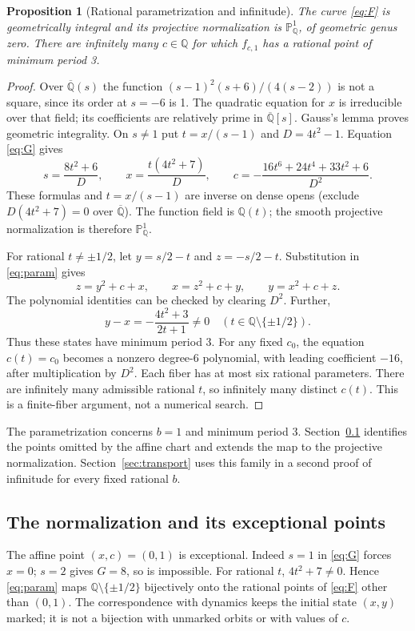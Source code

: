 \documentclass{jT}
\newcommand{\Q}{\mathbb Q}
\newcommand{\PP}{\mathbb P}
\newtheorem{proposition}{Proposition}[section]
\begin{document}
\begin{proposition}[Rational parametrization and infinitude]\label{prop:genus}
The curve \eqref{eq:F} is geometrically integral and its projective normalization is $\PP^1_\Q$, of geometric genus zero. There are infinitely many $c\in\Q$ for which $f_{c,1}$ has a rational point of minimum period 3.
\end{proposition}
\begin{proof}
Over $\overline{\Q}(s)$ the function $(s-1)^2(s+6)/(4(s-2))$ is not a square, since its order at $s=-6$ is 1. The quadratic equation for $x$ is irreducible over that field; its coefficients are relatively prime in $\overline{\Q}[s]$. Gauss's lemma proves geometric integrality. On $s\ne1$ put $t=x/(s-1)$ and $D=4t^2-1$. Equation \eqref{eq:G} gives
\begin{equation}\label{eq:param}
s=\frac{8t^2+6}{D},\qquad x=\frac{t(4t^2+7)}D,\qquad
c=-\frac{16t^6+24t^4+33t^2+6}{D^2}.
\end{equation}
These formulas and $t=x/(s-1)$ are inverse on dense opens (exclude $D(4t^2+7)=0$ over $\overline{\Q}$). The function field is $\Q(t)$; the smooth projective normalization is therefore $\PP^1_\Q$.

For rational $t\ne\pm1/2$, let $y=s/2-t$ and $z=-s/2-t$. Substitution in \eqref{eq:param} gives
\[
z=y^2+c+x,\qquad x=z^2+c+y,\qquad y=x^2+c+z.
\]
The polynomial identities can be checked by clearing $D^2$. Further,
\[
y-x=-\frac{4t^2+3}{2t+1}\ne0\quad(t\in\Q\setminus\{\pm1/2\}).
\]
Thus these states have minimum period 3. For any fixed $c_0$, the equation $c(t)=c_0$ becomes a nonzero degree-6 polynomial, with leading coefficient $-16$, after multiplication by $D^2$. Each fiber has at most six rational parameters. There are infinitely many admissible rational $t$, so infinitely many distinct $c(t)$. This is a finite-fiber argument, not a numerical search.
\end{proof}

The parametrization concerns $b=1$ and minimum period 3. Section~\ref{app:lifting} identifies the points omitted by the affine chart and extends the map to the projective normalization. Section~\ref{sec:transport} uses this family in a second proof of infinitude for every fixed rational $b$.

\subsection{The normalization and its exceptional points}\label{app:lifting}
The affine point $(x,c)=(0,1)$ is exceptional. Indeed $s=1$ in \eqref{eq:G} forces $x=0$; $s=2$ gives $G=8$, so is impossible. For rational $t$, $4t^2+7\ne0$. Hence \eqref{eq:param} maps $\Q\setminus\{\pm1/2\}$ bijectively onto the rational points of \eqref{eq:F} other than $(0,1)$. The correspondence with dynamics keeps the initial state $(x,y)$ marked; it is not a bijection with unmarked orbits or with values of $c$.
\end{document}
